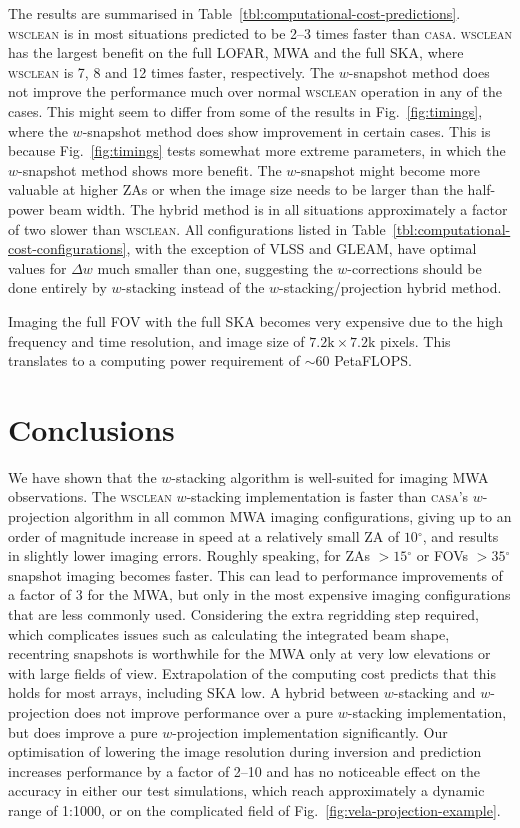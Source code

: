 \documentclass[useAMS,usenatbib]{mn2e}
\newcommand{\degree}{\ensuremath{^{\circ}}\xspace}
\begin{document}
The results are summarised in Table~\ref{tbl:computational-cost-predictions}. \textsc{wsclean} is in most situations predicted to be 2--3 times faster than \textsc{casa}. \textsc{wsclean} has the largest benefit on the full LOFAR, MWA and the full SKA, where \textsc{wsclean} is 7, 8 and 12 times faster, respectively. The $w$-snapshot method does not improve the performance much over normal \textsc{wsclean} operation in any of the cases. This might seem to differ from some of the results in Fig.~\ref{fig:timings}, where the $w$-snapshot method does show improvement in certain cases. This is because Fig.~\ref{fig:timings} tests somewhat more extreme parameters, in which the $w$-snapshot method shows more benefit. The $w$-snapshot might become more valuable at higher ZAs or when the image size needs to be larger than the half-power beam width. The hybrid method is in all situations approximately a factor of two slower than \textsc{wsclean}. All configurations listed in Table~\ref{tbl:computational-cost-configurations}, with the exception of VLSS and GLEAM, have optimal values for $\Delta w$ much smaller than one, suggesting the $w$-corrections should be done entirely by $w$-stacking instead of the $w$-stacking/projection hybrid method.

Imaging the full FOV with the full SKA becomes very expensive due to the high frequency and time resolution, and image size of $7.2\textrm{k} \times 7.2$k pixels. This translates to a computing power requirement of $\sim60$ PetaFLOPS.

\section{Conclusions} \label{sec:conclusions}
We have shown that the $w$-stacking algorithm is well-suited for imaging MWA observations. The \textsc{wsclean} $w$-stacking implementation is faster than \textsc{casa}'s $w$-projection algorithm in all common MWA imaging configurations, giving up to an order of magnitude increase in speed at a relatively small ZA of $10$\degree, and results in slightly lower imaging errors. Roughly speaking, for ZAs $>15\degree$ or FOVs $>35\degree$ snapshot imaging becomes faster. This can lead to performance improvements of a factor of $3$ for the MWA, but only in the most expensive imaging configurations that are less commonly used. Considering the extra regridding step required, which complicates issues such as calculating the integrated beam shape, recentring snapshots is worthwhile for the MWA only at very low elevations or with large fields of view. Extrapolation of the computing cost predicts that this holds for most arrays, including SKA low. A hybrid between $w$-stacking and $w$-projection does not improve performance over a pure $w$-stacking implementation, but does improve a pure $w$-projection implementation significantly. Our optimisation of lowering the image resolution during inversion and prediction increases performance by a factor of 2--10 and has no noticeable effect on the accuracy in either our test simulations, which reach approximately a dynamic range of 1:1000, or on the complicated field of Fig.~\ref{fig:vela-projection-example}.
\end{document}
